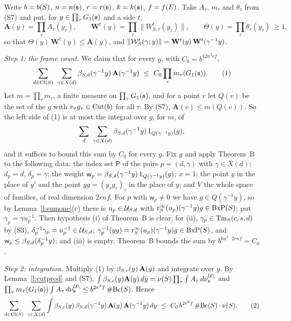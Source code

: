 \documentclass[11pt,a4paper]{article}
\makeatletter
\theoremstyle{plainx}
\theoremstyle{uprightx}
\renewenvironment{proof}[1][Proof]{\par\pushQED{\qed}\normalfont\topsep0pt\partopsep0pt
  \trivlist\item[\hskip\labelsep\itshape #1.]\ignorespaces}{\popQED\endtrivlist\@endpefalse}
\newcommand{\Wsys}[3]{W^{#1}_{#2,#3}}                      %
\newcommand{\muq}[1]{\nu^{\mathcal{U}\backslash}_{#1}}     %
\newcommand{\sP}{\mathsf{P}}
\newcommand{\sw}{\mathsf{w}}
\makeatother
\begin{document}
\begin{proof}[Proof of Theorem D]
Write $b=b(S)$, $n=n(\mathfrak{s})$, $r=r(\mathfrak{s})$, $k=k(\mathfrak{s})$, $f=f(E)$. Take $A_\tau$, $m_\tau$ and $\theta_\tau$ from
(S7) and put, for $y\in\prod_\tau G_{1}(\mathfrak{s})$ and a side $t$,
\[\mathbf A(y)=\prod_\tau A_\tau(y_\tau),\qquad\mathbf W^{t}(y)=\prod_\tau\|\Wsys{t}{S}{\tau}(y_\tau)\|,\qquad
\Theta(y)=\prod_\tau\theta_\tau(y_\tau)\ \ge1,\]
so that $\Theta(y)\,\mathbf W^{t}(y)\le\mathbf A(y)$, and $\|\mathcal{W}^{t}_{S}(\gamma;y)\|=\mathbf W^{t}(y)\,\mathbf W^{t}(\gamma^{-1}y)$.

\emph{Step 1: the frame count.} We claim that for every $y$, with $C_0=b^{12n^3rf}$,
\[\sum_{d\in\Cl{S}}\ \sum_{\gamma\in X(d)}\cutoff{S}{d}(\gamma^{-1}y)\,\mathbf A(\gamma^{-1}y)\ \le\ C_0\prod_\tau m_\tau(\Gone{\fs}).\tag{1}\]
Let $m=\prod_\tau m_\tau$, a finite measure on $\prod_\tau G_{1}(\mathfrak{s})$, and for a point $v$ let $Q(v)$ be the set of the
$g$ with $v_\tau g_\tau\in\operatorname{Cut}(b)$ for all $\tau$. By (S7), $\mathbf A(v)\le m(Q(v))$. So the left side of (1) is at
most the integral over $g$, for $m$, of
\[\sum_{d}\ \sum_{\gamma\in X(d)}\beta_{S,d}(\gamma^{-1}y)\,1_{Q(\gamma^{-1}y)}(g),\]
and it suffices to bound this sum by $C_0$ for every $g$. Fix $g$ and apply Theorem~B to the following data: the
index set $\sP$ of the pairs $p=(d,\gamma)$ with $\gamma\in X(d)$; $d_p=d$, $\delta_p=\gamma$; the weight
$\sw_p=\cutoff{S}{d}(\gamma^{-1}y)\,1_{Q(\gamma^{-1}y)}(g)$; $x=1$; the point $y$ in the place of $y'$ and the point
$yg=(y_\tau g_\tau)_\tau$ in the place of $y$; and $V$ the whole space of families, of real dimension $2rnf$. For $p$
with $\sw_p\ne0$ we have $g\in Q(\gamma^{-1}y)$, so by Lemma~\ref{l:sumone}(c) there is $u_p\in\mathcal{U}_{S,d}$ with
$\mathrm{r}^{\infty}_{S}(u_p)(\gamma^{-1}y)g\in\operatorname{BxP}(S)$; put $\gamma_p=\gamma u_p^{-1}$. Then hypothesis (i) of Theorem~B is clear;
for (ii), $\gamma_p\in\mathrm{Tm}_{S}(c,s,d)$ by (S3), $\delta_p^{-1}\gamma_p=u_p^{-1}\in\mathcal{U}_{S,d}$,
$\gamma_p^{-1}(yg)=\mathrm{r}^{\infty}_{S}(u_p)(\gamma^{-1}y)g\in\operatorname{BxP}(S)$, and $\sw_p\le\cutoff{S}{d}(\delta_p^{-1}y)$; and (iii) is
empty. Theorem~B bounds the sum by $b^{6n^2\cdot2rnf}=C_0$.

\emph{Step 2: integration.} Multiply (1) by $\beta_{S,c}(y)\,\mathbf A(y)$ and integrate over $y$. By
Lemma~\ref{l:cutprod} and (S7),
$\int\cutoff{S}{c}(y)\mathbf A(y)\,dy=\ucov{S}\prod_\tau\int A_\tau\,d\muq{\fs}$ and
$\prod_\tau m_\tau(\Gone{\fs})\int A_\tau\,d\muq{\fs}\le b^{2r^3f}\,\#\Bc{S}$. Hence
\[\sum_{d\in\mathrm{Cl}(S)}\ \sum_{\gamma\in X(d)}\int\beta_{S,c}(y)\,\beta_{S,d}(\gamma^{-1}y)\,\mathbf A(y)\,\mathbf A(\gamma^{-1}y)\,dy
\ \le\ C_0\,b^{2r^3f}\,\#\mathrm{Bc}(S)\cdot\nu(S).\tag{2}\]


\end{proof}
\end{document}
